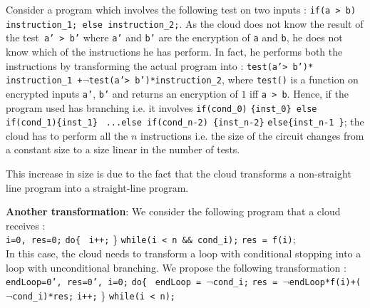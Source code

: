 \documentclass{acm_proc_article-sp}
\begin{document}
Consider a program which involves the following test on two inputs : \texttt{if(a > b) instruction\_1; else instruction\_2;}. As the cloud does not know the result of the test\texttt{ a' > b'} where \texttt{a'} and \texttt{b'} are the encryption of \texttt{a} and \texttt{b}, he does not know which of the instructions he has perform. In fact, he performs both the instructions by transforming the actual program into : \texttt{test(a'> b')*} \texttt{instruction\_1 +}$\neg$\texttt{test(a'> b')*instruction\_2}, where \texttt{test()}  is a function on encrypted inputs \texttt{a'}, \texttt{b'} and returns an encryption of $1$ iff \texttt{a > b}. Hence, if the program used has branching i.e. it involves \texttt{if(cond\_0)} \texttt{\{inst\_0\} else if(cond\_1)\{inst\_1\}} \texttt{ ...else if(cond\_n-2) \{inst\_n-2\}} \texttt{else\{inst\_n-1 \}}; the cloud has to perform all the $n$ instructions i.e. the size of the circuit changes from a constant size to a size linear in the number of tests.

This increase in size is due to the fact that the cloud transforms a non-straight line program into a straight-line program.

\textbf{Another transformation}: We consider the following program that a cloud receives : \\
 \phantom{x} \texttt{i=0, res=0;}
\newline \phantom{x} \texttt{do\{ }
\newline \phantom{x} \hspace{9ex} \texttt{i++;} 
\newline   \phantom{x} \} \texttt{while(i < n \&\& cond\_i);} 
\newline  \phantom{x} \texttt{res = f(i)};\\
In this case, the cloud needs to transform a loop with conditional stopping into a loop with unconditional branching. We propose the following transformation : \\
 \phantom{x} \texttt{endLoop=0', res=0', i=0;}
\newline \phantom{x} \texttt{do\{ }
\newline \phantom{x} \hspace{6ex} \texttt{endLoop = $\neg$cond\_i;}
\newline \phantom{x} \hspace{6ex} \texttt{res = $\neg$endLoop*f(i)+($\neg$cond\_i)*res;}
\newline \phantom{x} \hspace{6ex} \texttt{i++;} 
\newline   \phantom{x} \} \texttt{while(i < n);} 
\end{document}
